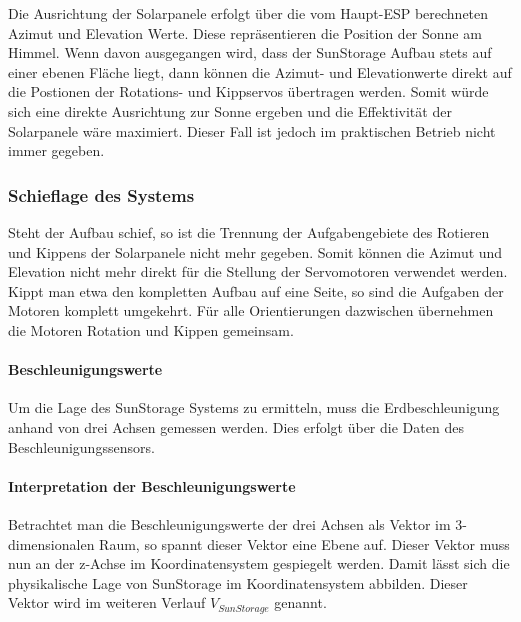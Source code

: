 Die Ausrichtung der Solarpanele erfolgt über die vom Haupt-ESP berechneten Azimut und Elevation Werte.
Diese repräsentieren die Position der Sonne am Himmel. 
Wenn davon ausgegangen wird, dass der SunStorage Aufbau stets auf einer ebenen Fläche liegt, dann können die Azimut- und Elevationwerte direkt auf die Postionen der Rotations- und Kippservos übertragen werden. 
Somit würde sich eine direkte Ausrichtung zur Sonne ergeben und die Effektivität der Solarpanele wäre maximiert.
Dieser Fall ist jedoch im praktischen Betrieb nicht immer gegeben.

\subsubsection{Schieflage des Systems}
Steht der Aufbau schief, so ist die Trennung der Aufgabengebiete des Rotieren und Kippens der Solarpanele nicht mehr gegeben.
Somit können die Azimut und Elevation nicht mehr direkt für die Stellung der Servomotoren verwendet werden.
Kippt man etwa den kompletten Aufbau auf eine Seite, so sind die Aufgaben der Motoren komplett umgekehrt.
Für alle Orientierungen dazwischen übernehmen die Motoren Rotation und Kippen gemeinsam.

\paragraph{Beschleunigungswerte}
Um die Lage des SunStorage Systems zu ermitteln, muss die Erdbeschleunigung anhand von drei Achsen gemessen werden. 
Dies erfolgt über die Daten des Beschleunigungssensors.

\paragraph{Interpretation der Beschleunigungswerte}
Betrachtet man die Beschleunigungswerte der drei Achsen als Vektor im 3-dimensionalen Raum, 
so spannt dieser Vektor eine Ebene auf. 
Dieser Vektor muss nun an der z-Achse im Koordinatensystem gespiegelt werden. 
Damit lässt sich die physikalische Lage von SunStorage im Koordinatensystem abbilden.
Dieser Vektor wird im weiteren Verlauf $ V_{SunStorage} $ genannt.

